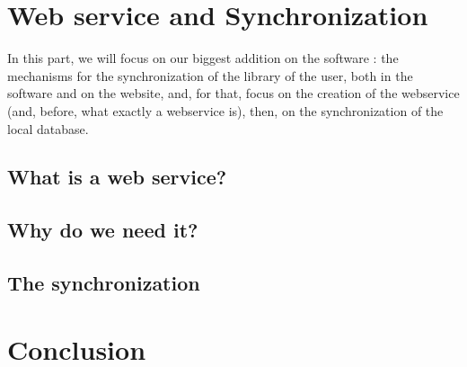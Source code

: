 \documentclass[11pt]{report} %
\begin{document}
%
% 

\chapter{Web service and Synchronization}
In this part, we will focus on our biggest addition on the software : the mechanisms for the synchronization of the library of the user, both in the software and on the website, and, for that, focus on the creation of the webservice (and, before, what exactly a webservice is), then, on the synchronization of the local database.

\section{What is a web service?}
%
%
\section{Why do we need it?}
%
%
\section{The synchronization}
%
% 

\chapter{Conclusion}
%
%
%
%



\end{document}
